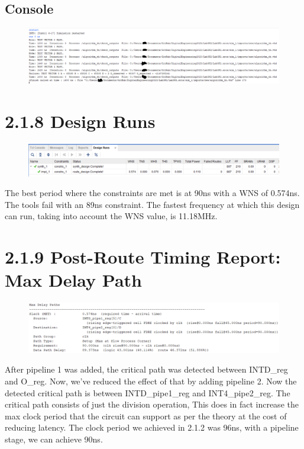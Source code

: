 \documentclass[11pt]{report}
\begin{document}
\subsection*{Console}
\begin{figure}[H]
    \includegraphics[width=\columnwidth]{Assets/2.1.7_console.png}
\end{figure}

\section*{2.1.8 Design Runs}
\begin{figure}[H]
    \includegraphics[width=\columnwidth]{Assets/2.1.8_design-runs.png}
\end{figure}
The best period where the constraints are met is at 90ns with a WNS of 0.574ns. The tools fail with an 89ns constraint. The fastest frequency at which this design can run, taking into account the WNS value, is 11.18MHz.

\section*{2.1.9 Post-Route Timing Report: Max Delay Path}
\begin{figure}[H]
    \includegraphics[width=\columnwidth]{Assets/2.1.9_max-delay-path.png}
\end{figure}
After pipeline 1 was added, the critical path was detected between INTD\_reg and O\_reg. Now, we've reduced the effect of that by adding pipeline 2. Now the detected critical path is between INTD\_pipe1\_reg and INT4\_pipe2\_reg. The critical path consists of just the division operation, This does in fact increase the max clock period that the circuit can support as per the theory at the cost of reducing latency. The clock period we achieved in 2.1.2 was 96ns, with a pipeline stage, we can achieve 90ns.
\end{document}
